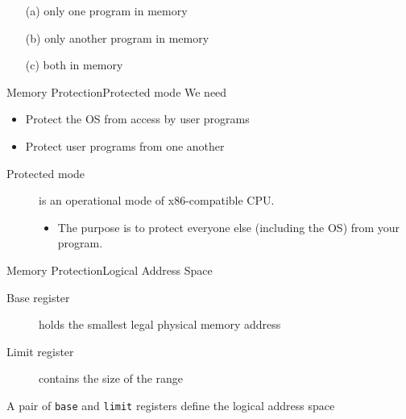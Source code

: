 \begin{enumerate}
\item[(a)] only one program in memory
\item[(b)] only another program in memory
\item[(c)] both in memory
\end{enumerate}

\begin{frame}{Memory Protection}{Protected mode}
  We need
  \begin{itemize}
  \item Protect the OS from access by user programs
  \item Protect user programs from one another
  \end{itemize}
  \begin{description}
  \item[Protected mode] is an operational mode of x86-compatible CPU.
    \begin{itemize}
    \item The purpose is to protect everyone else (including the OS) from your program.
    \end{itemize}
  \end{description}
\end{frame}

\begin{frame}{Memory Protection}{Logical Address Space}
  \begin{description}
  \item[Base register] holds the smallest legal physical memory address
  \item[Limit register] contains the size of the range
  \end{description}
  \begin{varwidth}{.48\textwidth}
    \begin{center}
       
    \end{center}
  \end{varwidth}\hfill
  \begin{varwidth}{.45\textwidth}
    A pair of \texttt{base} and \texttt{limit} registers define the logical address space
    \begin{center}
    \end{center}
    \begin{center}
      {}
    \end{center}
    \begin{center}
    \end{center}
  \end{varwidth}
\end{frame}

